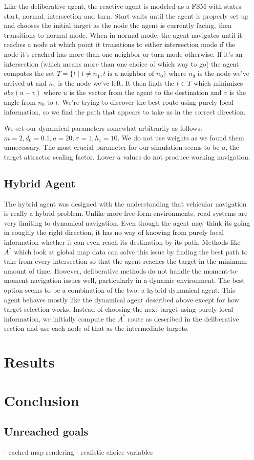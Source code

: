 \documentclass{article}
\begin{document}
Like the deliberative agent, the reactive agent is modeled
as a FSM with states start, normal, intersection and turn. Start
waits until the agent is properly set up and chooses the initial
target as the node the agent is currently facing, then transitions to
normal mode. When in normal mode, the agent navigates until it
reaches a node at which point it transitions to either intersection
mode if the node it's reached has more than one neighbor or turn mode
otherwise. If it's an intersection (which means more than one choice
of which way to go) the agent computes the set $T = \{t\;|\;t\neq
n_1,t \mbox{ is a neighbor of } n_0\}$ where $n_0$ is the node we've
arrived at and $n_1$ is the node we've left. It then finds the $t\in
T$ which minimizes $abs(u-v)$ where $u$ is the vector from the agent
to the destination and $v$ is the angle from $n_0$ to $t$. We're
trying to discover the best route using purely local information, so
we find the path that appears to take us in the correct direction.

We set our dynamical parameters somewhat arbitrarily as follows: $m =
2, d_0 = 0.1, a = 20, \sigma = 1, h_1 = 10$. We do not use weights as
we found them unnecessary. The most crucial parameter for our
simulation seems to be $a$, the target attractor scaling factor. Lower
$a$ values do not produce working navigation.

\subsection{Hybrid Agent}
The hybrid agent was designed with the understanding that vehicular
navigation is really a hybrid problem. Unlike more free-form
environments, road systems are very limiting to dynamical
navigation. Even though the agent may think its going in roughly the
right direction, it has no way of knowing from purely local
information whether it can even reach its destination by its
path. Methods like $A^*$ which look at global map data can solve this
issue by finding the best path to take from every intersection so that
the agent reaches the target in the minimum amount of time. However,
deliberative methods do not handle the moment-to-moment navigation
issues well, particularly in a dynamic environment. The best option
seems to be a combination of the two: a hybrid dynamical agent. This
agent behaves mostly like the dynamical agent described above except
for how target selection works. Instead of choosing the next target
using purely local information, we initially compute the $A^*$ route
as described in the deliberative section and use each node of that as
the intermediate targets.

\section{Results}

\section{Conclusion}
\subsection{Unreached goals}
- cached map rendering
- realistic choice variables
\end{document}

